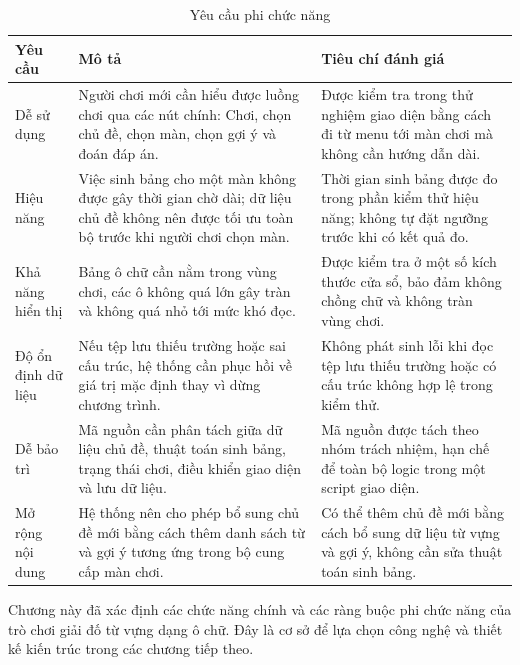﻿\documentclass[../DoAn.tex]{subfiles}
\begin{document}
\begin{table}[H]
\centering
\begin{tabular}{|p{2.7cm}|p{6.3cm}|p{4.8cm}|}
\hline
\textbf{Yêu cầu} & \textbf{Mô tả} & \textbf{Tiêu chí đánh giá} \\ \hline
Dễ sử dụng & Người chơi mới cần hiểu được luồng chơi qua các nút chính: Chơi, chọn chủ đề, chọn màn, chọn gợi ý và đoán đáp án. & Được kiểm tra trong thử nghiệm giao diện bằng cách đi từ menu tới màn chơi mà không cần hướng dẫn dài. \\ \hline
Hiệu năng & Việc sinh bảng cho một màn không được gây thời gian chờ dài; dữ liệu chủ đề không nên được tối ưu toàn bộ trước khi người chơi chọn màn. & Thời gian sinh bảng được đo trong phần kiểm thử hiệu năng; không tự đặt ngưỡng trước khi có kết quả đo. \\ \hline
Khả năng hiển thị & Bảng ô chữ cần nằm trong vùng chơi, các ô không quá lớn gây tràn và không quá nhỏ tới mức khó đọc. & Được kiểm tra ở một số kích thước cửa sổ, bảo đảm không chồng chữ và không tràn vùng chơi. \\ \hline
Độ ổn định dữ liệu & Nếu tệp lưu thiếu trường hoặc sai cấu trúc, hệ thống cần phục hồi về giá trị mặc định thay vì dừng chương trình. & Không phát sinh lỗi khi đọc tệp lưu thiếu trường hoặc có cấu trúc không hợp lệ trong kiểm thử. \\ \hline
Dễ bảo trì & Mã nguồn cần phân tách giữa dữ liệu chủ đề, thuật toán sinh bảng, trạng thái chơi, điều khiển giao diện và lưu dữ liệu. & Mã nguồn được tách theo nhóm trách nhiệm, hạn chế để toàn bộ logic trong một script giao diện. \\ \hline
Mở rộng nội dung & Hệ thống nên cho phép bổ sung chủ đề mới bằng cách thêm danh sách từ và gợi ý tương ứng trong bộ cung cấp màn chơi. & Có thể thêm chủ đề mới bằng cách bổ sung dữ liệu từ vựng và gợi ý, không cần sửa thuật toán sinh bảng. \\ \hline
\end{tabular}
\caption{Yêu cầu phi chức năng}
\label{table:nonfunctional}
\end{table}

Chương này đã xác định các chức năng chính và các ràng buộc phi chức năng của trò chơi giải đố từ vựng dạng ô chữ. Đây là cơ sở để lựa chọn công nghệ và thiết kế kiến trúc trong các chương tiếp theo.
\end{document}
